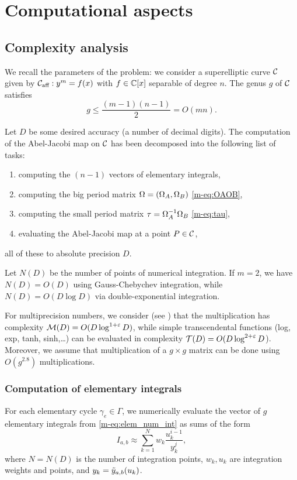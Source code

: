 \documentclass[main.tex]{subfiles}
\begin{document}
  \section{Computational aspects}\label{sec:comp_asp}

   \subsection{Complexity analysis}

   We recall the parameters of the problem: we consider a superelliptic curve $\mathcal{C}$ given by
   $\mathcal{C}_{\text{aff}}:y^m=f(x)$ with $f \in \mathbb{C}[x]$ separable of degree $n$. The genus $g$ of $\mathcal{C}$ satisfies
   $$g \leq \frac{(m-1)(n-1)}2=O(mn).$$

   Let $D$ be some desired accuracy (a number of decimal digits). The computation of
   the Abel-Jacobi map on $\mathcal{C}$ has been decomposed into the
   following list of tasks:
   \begin{enumerate}
       \item computing the $(n-1)$ vectors of elementary integrals,
       \item computing the big period matrix $\Omega=(\Omega_A,\Omega_B)$ \eqref{m-eq:OAOB},
       \item computing the small period matrix $\tau = \Omega_A^{-1}\Omega_B$ \eqref{m-eq:tau},
       \item evaluating the Abel-Jacobi map at a point $P \in \mathcal{C}$,
   \end{enumerate}
   all of these to absolute precision $D$.

   Let $N(D)$ be the number of points of numerical integration.
   If $m=2$, we have
   $N(D)=O(D)$ using Gauss-Chebychev integration, while $N(D)=O(D\log D)$
   via double-exponential integration.

   For multiprecision numbers, we consider (see \cite{BrentZimmermann}) that the multiplication has
   complexity $\mathcal M(D)=O(D \log^{1+\varepsilon}D)$,
   while simple transcendental functions (log, exp, tanh, sinh,\dots) can be evaluated
   in complexity $\mathcal T(D)=O(D\log^{2+\varepsilon} D$).
    Moreover, we assume that multiplication of a $g \times g$ matrix can
    be done using $O(g^{2.8})$ multiplications.

   \subsubsection{Computation of elementary integrals}
   \label{sec:comp_elem}

   For each elementary cycle $\gamma_e\in \Gamma$, we numerically evaluate the vector of $g$
   elementary integrals from \eqref{m-eq:elem_num_int} as sums of the form
   \begin{equation*}
       I_{a,b} \approx \sum_{k=1}^N w_k\frac{u_k^{i-1}}{y_k^j},
   \end{equation*}
   where $N = N(D)$ is the number of integration points, $w_k,u_k$ are integration weights and points,
   and $y_k=\tilde{y}_{a,b}(u_k)$.
\end{document}
